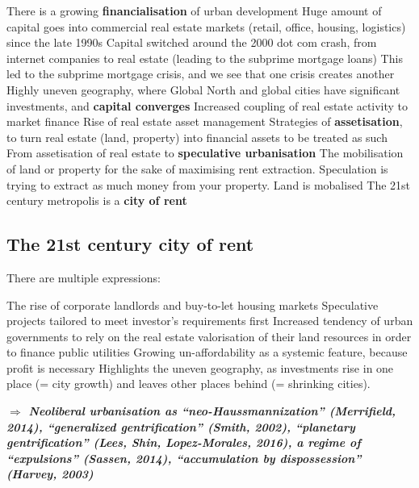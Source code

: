 \documentclass{article}
\begin{document}
\begin{outline}
	\1 There is a growing \textbf{financialisation} of urban development
		\2 Huge amount of capital goes into commercial real estate markets (retail, office, housing, logistics) since the late 1990s
			\3 Capital switched around the 2000 dot com crash, from internet companies to real estate (leading to the subprime mortgage loans)
			\3 This led to the subprime mortgage crisis, and we see that one crisis creates another
			\3 Highly uneven geography, where Global North and global cities have significant investments, and \textbf{capital converges} 
		\2 Increased coupling of real estate activity to market finance
			\3 Rise of real estate asset management
			\3 Strategies of \textbf{assetisation}, to turn real estate (land, property) into financial assets to be treated as such
	\1 From assetisation of real estate to \textbf{speculative urbanisation}
		\2 The mobilisation of land or property for the sake of maximising rent extraction.
		\2 Speculation is trying to extract as much money from your property. Land is mobalised
		\2 The 21st century metropolis is a \textbf{city of rent}
\end{outline}

\subsection{The 21st century city of rent}

There are multiple expressions:

\begin{outline}
	\1 The rise of corporate landlords and buy-to-let housing markets
	\1 Speculative projects tailored to meet investor's requirements first
	\1 Increased tendency of urban governments to rely on the real estate valorisation of their land resources in order to finance public utilities
	\1 Growing un-affordability as a systemic feature, because profit is necessary
		\2 Highlights the uneven geography, as investments rise in one place (= city growth) and leaves other places behind (= shrinking cities).
\end{outline}

\textit{\textbf{$\Rightarrow$ Neoliberal urbanisation as “neo-Haussmannization” (Merrifield, 2014), “generalized gentrification” (Smith, 2002), “planetary gentrification” (Lees, Shin, Lopez-Morales, 2016), a regime of “expulsions” (Sassen, 2014), “accumulation by dispossession” (Harvey, 2003)}}
\end{document}
